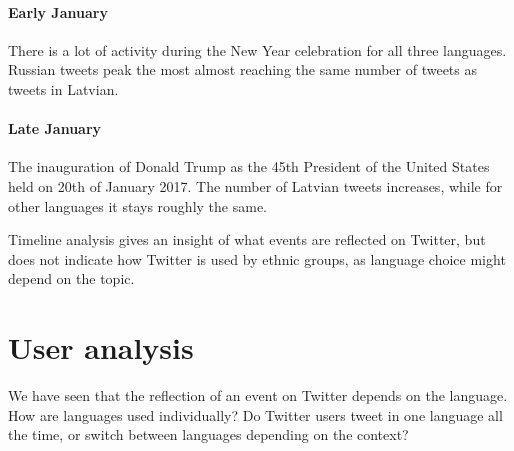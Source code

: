 \documentclass[11pt,a4paper]{article}
\begin{document}


\paragraph{Early January}

There is a lot of activity during the New Year celebration for all three languages. Russian tweets peak the most almost reaching the same number of tweets as tweets in Latvian.

\paragraph{Late January}



The inauguration of Donald Trump as the 45th President of the United States held on 20th of January 2017. The number of Latvian tweets increases, while for other languages it stays roughly the same.





Timeline analysis gives an insight of what events are reflected on Twitter, but does not indicate how Twitter is used by ethnic groups, as language choice might depend on the topic.

\section{User analysis}
\label{sec:lang-use}

We have seen that the reflection of an event on Twitter depends on the language. How are languages used individually? Do Twitter users tweet in one language all the time, or switch between languages depending on the context?
\end{document}
